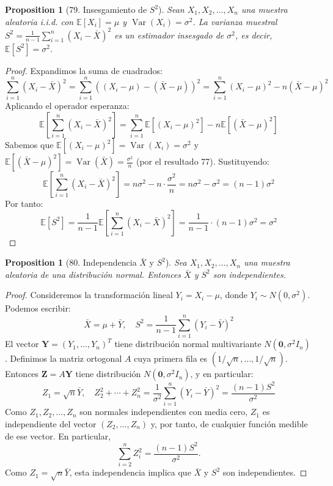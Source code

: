 \documentclass[11pt,a4paper]{article}
\theoremstyle{plain}
\newtheorem{proposition}[theorem]{Proposition}
\theoremstyle{definition}
\begin{document}
\begin{proposition}[79. Insesgamiento de $S^2$]
Sean $X_1, X_2, \ldots, X_n$ una muestra aleatoria i.i.d. con $\mathbb{E}[X_i] = \mu$ y $\operatorname{Var}(X_i) = \sigma^2$. La varianza muestral $S^2 = \frac{1}{n-1}\sum_{i=1}^n (X_i - \bar{X})^2$ es un estimador insesgado de $\sigma^2$, es decir, $\mathbb{E}[S^2] = \sigma^2$.
\end{proposition}

\begin{proof}
Expandimos la suma de cuadrados:
\[
\sum_{i=1}^n (X_i - \bar{X})^2 = \sum_{i=1}^n \left((X_i - \mu) - (\bar{X} - \mu)\right)^2 = \sum_{i=1}^n (X_i - \mu)^2 - n(\bar{X} - \mu)^2
\]
Aplicando el operador esperanza:
\[
\mathbb{E}\left[\sum_{i=1}^n (X_i - \bar{X})^2\right] = \sum_{i=1}^n \mathbb{E}[(X_i - \mu)^2] - n\mathbb{E}[(\bar{X} - \mu)^2]
\]
Sabemos que $\mathbb{E}[(X_i - \mu)^2] = \operatorname{Var}(X_i) = \sigma^2$ y $\mathbb{E}[(\bar{X} - \mu)^2] = \operatorname{Var}(\bar{X}) = \frac{\sigma^2}{n}$ (por el resultado 77). Sustituyendo:
\[
\mathbb{E}\left[\sum_{i=1}^n (X_i - \bar{X})^2\right] = n\sigma^2 - n \cdot \frac{\sigma^2}{n} = n\sigma^2 - \sigma^2 = (n-1)\sigma^2
\]
Por tanto:
\[
\mathbb{E}[S^2] = \frac{1}{n-1}\mathbb{E}\left[\sum_{i=1}^n (X_i - \bar{X})^2\right] = \frac{1}{n-1} \cdot (n-1)\sigma^2 = \sigma^2
\]
\end{proof}

\begin{proposition}[80. Independencia $\bar{X}$ y $S^2$]
Sea $X_1, X_2, \ldots, X_n$ una muestra aleatoria de una distribución normal. Entonces $\bar{X}$ y $S^2$ son independientes.
\end{proposition}

\begin{proof}
Consideremos la transformación lineal $Y_i = X_i - \mu$, donde $Y_i \sim N(0, \sigma^2)$. Podemos escribir:
\[
\bar{X} = \mu + \bar{Y}, \quad S^2 = \frac{1}{n-1}\sum_{i=1}^n (Y_i - \bar{Y})^2
\]
El vector $\mathbf{Y} = (Y_1, \ldots, Y_n)^T$ tiene distribución normal multivariante $N(\mathbf{0}, \sigma^2 I_n)$. Definimos la matriz ortogonal $A$ cuya primera fila es $(1/\sqrt{n}, \ldots, 1/\sqrt{n})$. Entonces $\mathbf{Z} = A\mathbf{Y}$ tiene distribución $N(\mathbf{0}, \sigma^2 I_n)$, y en particular:
\[
Z_1 = \sqrt{n}\bar{Y}, \quad Z_2^2 + \cdots + Z_n^2 = \frac{1}{\sigma^2}\sum_{i=1}^n (Y_i - \bar{Y})^2 = \frac{(n-1)S^2}{\sigma^2}
\]
Como $Z_1, Z_2, \ldots, Z_n$ son normales independientes con media cero,
$Z_1$ es independiente del vector $(Z_2, \ldots, Z_n)$ y, por tanto, de
cualquier función medible de ese vector. En particular,
\[
\sum_{i=2}^n Z_i^2 = \frac{(n-1)S^2}{\sigma^2}.
\]
Como $Z_1 = \sqrt{n}\bar{Y}$, esta independencia implica que $\bar{X}$ y
$S^2$ son independientes.
\end{proof}
\end{document}
